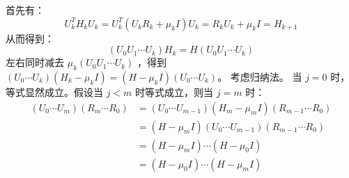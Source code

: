 \documentclass{article}
\begin{document}
\begin{solution}
  首先有：
  \[
    U_k^T H_k U_k = U_k^T(U_k R_k + \mu_k I)U_k = R_k U_k + \mu_k I = H_{k+1}
  \]
  从而得到：
  \[
    (U_0 U_1 \cdots U_k)H_k = H(U_0 U_1 \cdots U_k)
  \]
  左右同时减去 $\mu_k (U_0 U_1 \cdots U_k)$ ，得到 $(U_0 \cdots U_k)(H_k -
  \mu_k I) = (H - \mu_k I)(U_0 \cdots U_k)$。
  考虑归纳法。 当 $j = 0$ 时，等式显然成立。假设当 $j < m$ 时等式成立，则当 $j = m$ 时：
  \[
    \begin{aligned}
      (U_0 \cdots U_m)(R_m \cdots R_0) &= (U_0 \cdots U_{m-1})(H_m - \mu_m
      I)(R_{m-1} \cdots R_0) \\
      &= (H - \mu_m I)(U_0 \cdots U_{m-1})(R_{m-1} \cdots R_0)\\
      &= (H - \mu_m I) \cdots (H - \mu_0 I) \\
      &= (H - \mu_0 I) \cdots (H - \mu_m I)
    \end{aligned}
  \]

\end{solution}
\end{document}

